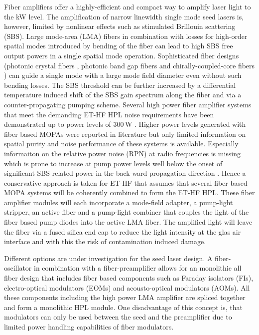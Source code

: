 Fiber amplifiers offer a highly-efficient and compact way to amplify laser light to the kW level. The amplification of narrow linewidth single mode seed lasers is, however, limited by nonlinear effects such as stimulated Brillouin scattering (SBS). Large mode-area (LMA) fibers in combination with losses for high-order spatial modes introduced by bending of the fiber can lead to high SBS free output powers in a single spatial mode operation. Sophisticated fiber designs (photonic crystal fibers \cite{Limpert2006}, photonic band gap fibers \cite{Gu2014} and chirally-coupled-core fibers \cite{Ma2014}) can guide a single mode with a large mode field diameter even without such bending losses.
The SBS threshold can be further increased by a differential temperature induced shift of the SBS gain spectrum along the fiber and via a counter-propagating pumping scheme. Several high power fiber amplifier systems that meet the demanding ET-HF HPL noise requirements have been demonstrated up to power levels of 300\,W \cite{Theeg2012, Zhao2018, Wellmann2019} .
Higher power levels generated with fiber based MOPAs were reported in literature but only limited information on spatial purity and noise performance of these systems is available. Especially informaiton on the relative power noise (RPN) at radio frequencies is missing which is prone to increase at pump power levels well below the onset of significant SBS related power in the back-ward propagation direction \cite{Zhang2005}. Hence a conservative approach is taken for ET-HF that assumes that several fiber based MOPA systems will be coherently combined to form the ET-HF HPL. 
These fiber amplifier modules will each incorporate a mode-field adapter, a pump-light stripper, an active fiber and a pump-light combiner that couples the light of the fiber based pump diodes into the active LMA fiber. The amplified light will leave the fiber via a fused silica end cap to reduce the light intensity at the glas air interface and with this the risk of contamination induced damage.

Different options are under investigation for the seed laser design. A
fiber-oscillator in combination with a fiber-preamplifier allows for an
monolithic all fiber design that includes fiber based components such as Faraday
isolators (FIs), electro-optical modulators (EOMs) and acousto-optical
modulators (AOMs). All these components including the high power LMA amplifier
are spliced together and form a monolithic HPL module. One disadvantage of this
concept is, that modulators can only be used between the seed and the
preamplifier due to limited power handling capabilities of fiber modulators.


